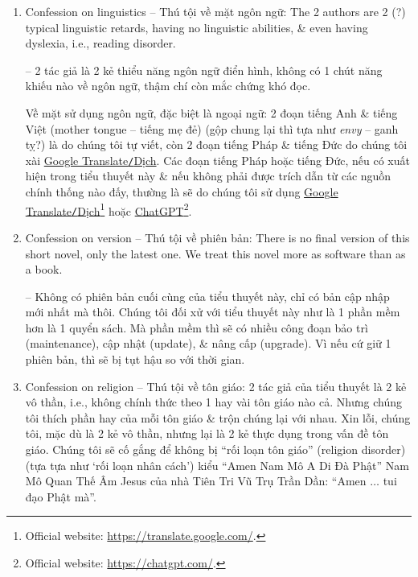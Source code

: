 \documentclass[12pt,twoside]{book}
\begin{document}
\begin{enumerate}
	\item {\sf Confession on linguistics -- Thú tội về mặt ngôn ngữ}: The 2 authors are 2 (?) typical linguistic retards, having no linguistic abilities, \& even having dyslexia, i.e., reading disorder.
	
	-- 2 tác giả là 2 kẻ thiểu năng ngôn ngữ điển hình, không có 1 chút năng khiếu nào về ngôn ngữ, thậm chí còn mắc chứng khó đọc.
	
	Về mặt sử dụng ngôn ngữ, đặc biệt là ngoại ngữ: 2 đoạn tiếng Anh {\sf[en]} \& tiếng Việt {\sf[vi]} (mother tongue -- tiếng mẹ đẻ) (gộp chung lại thì tựa như {\it envy} -- ganh tỵ?) là do chúng tôi tự viết, còn 2 đoạn tiếng Pháp {\sf[fr]} \& tiếng Đức {\sf[de]} do chúng tôi xài \href{https://translate.google.com}{\sf Google Translate{\tt/}Dịch}. Các đoạn tiếng Pháp hoặc tiếng Đức, nếu có xuất hiện trong tiểu thuyết này \& nếu không phải được trích dẫn từ các nguồn chính thống nào đấy, thường là sẽ do chúng tôi sử dụng \href{https://translate.google.com}{\sf Google Translate{\tt/}Dịch}\footnote{Official website: \url{https://translate.google.com/}.} hoặc \href{https://chatgpt.com/}{\sf ChatGPT}\footnote{Official website: \url{https://chatgpt.com/}.}.
	
	\item {\sf Confession on version -- Thú tội về phiên bản}: There is no final version of this short novel, only the latest one. We treat this novel more as software than as a book.
	
	-- Không có phiên bản cuối cùng của tiểu thuyết này, chỉ có bản cập nhập mới nhất mà thôi. Chúng tôi đối xử với tiểu thuyết này như là 1 phần mềm hơn là 1 quyển sách. Mà phần mềm thì sẽ có nhiều công đoạn bảo trì (maintenance), cập nhật (update), \& nâng cấp (upgrade). Vì nếu cứ giữ 1 phiên bản, thì sẽ bị tụt hậu so với thời gian.
	\item {\sf Confession on religion -- Thú tội về tôn giáo}: 2 tác giả của tiểu thuyết là 2 kẻ vô thần, i.e., không chính thức theo 1 hay vài tôn giáo nào cả. Nhưng chúng tôi thích phần hay của mỗi tôn giáo \& trộn chúng lại với nhau. Xin lỗi, chúng tôi, mặc dù là 2 kẻ vô thần, nhưng lại là 2 kẻ thực dụng trong vấn đề tôn giáo. Chúng tôi sẽ cố gắng để không bị ``rối loạn tôn giáo'' (religion disorder) (tựa tựa như `rối loạn nhân cách') kiểu ``Amen Nam Mô A Di Đà Phật'' Nam Mô Quan Thế Âm Jesus của nhà Tiên Tri Vũ Trụ {\sc Trần Dần}: ``Amen $\ldots$ tui đạo Phật mà''.
\end{enumerate}
\end{document}
